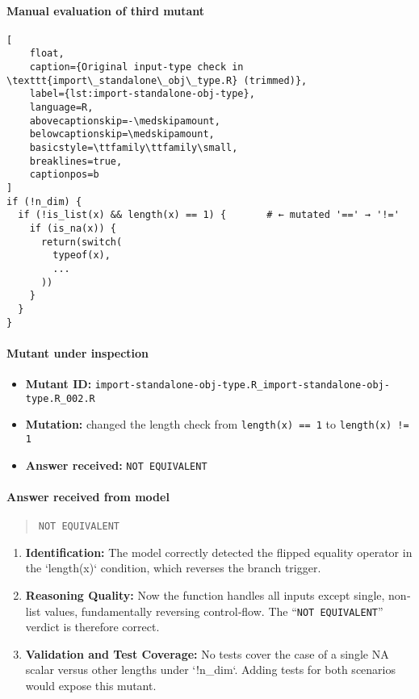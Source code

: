 \paragraph{Manual evaluation of third mutant}
\begin{lstlisting}[
    float,
    caption={Original input‐type check in \texttt{import\_standalone\_obj\_type.R} (trimmed)},
    label={lst:import-standalone-obj-type},
    language=R,
    abovecaptionskip=-\medskipamount,
    belowcaptionskip=\medskipamount,
    basicstyle=\ttfamily\ttfamily\small,
    breaklines=true,
    captionpos=b
]
if (!n_dim) {
  if (!is_list(x) && length(x) == 1) {       # ← mutated '==' → '!='
    if (is_na(x)) {
      return(switch(
        typeof(x),
        ...
      ))
    }
  }
}
\end{lstlisting}

\paragraph{Mutant under inspection}
\begin{itemize}
  \item \textbf{Mutant ID:} \texttt{import-standalone-obj-type.R\_import-standalone-obj-type.R\_002.R}
  \item \textbf{Mutation:} changed the length check from \texttt{length(x) == 1} to \texttt{length(x) != 1}
  \item \textbf{Answer received:} \texttt{NOT EQUIVALENT}
\end{itemize}

\paragraph{Answer received from model}
\begin{quote}
\texttt{NOT EQUIVALENT}
\end{quote}

\begin{enumerate}
  \item \textbf{Identification:}  
    The model correctly detected the flipped equality operator in the `length(x)` condition, which reverses the branch trigger.

  \item \textbf{Reasoning Quality:}  
    Now the function handles all inputs except single, non‐list values, fundamentally reversing control‐flow. The “\texttt{NOT EQUIVALENT}” verdict is therefore correct.

  \item \textbf{Validation and Test Coverage:}  
    No tests cover the case of a single NA scalar versus other lengths under `!n\_dim`. Adding tests for both scenarios would expose this mutant.
\end{enumerate}


